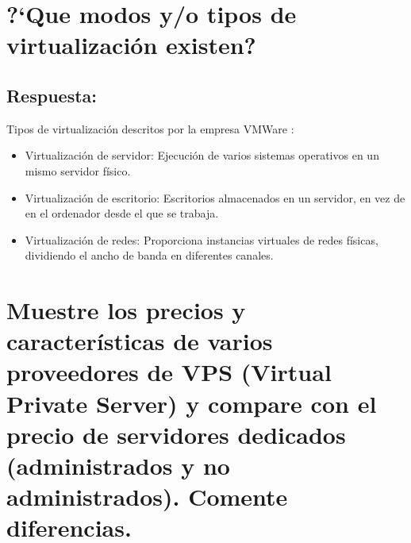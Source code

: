 \maketitle %
\thispagestyle{empty} %

\newpage %

\tableofcontents %

\listoffigures

\listoftables

\newpage


\section{?`Que modos y/o tipos de virtualización existen?}

\subsection{Respuesta:}
Tipos de virtualización descritos por la empresa VMWare \cite{cuestion1} :
\begin{itemize}
	\item Virtualización de servidor: Ejecución de varios sistemas operativos en un mismo servidor físico.
	\item Virtualización de escritorio: Escritorios almacenados en un servidor, en vez de en el ordenador desde el que se trabaja.
	\item Virtualización de redes: Proporciona instancias virtuales de redes físicas, dividiendo el ancho de banda en diferentes canales.
\end{itemize}


\section{Muestre los precios y características de varios proveedores de VPS (Virtual Private Server) y compare con el precio de servidores dedicados (administrados y no administrados). Comente diferencias.}


